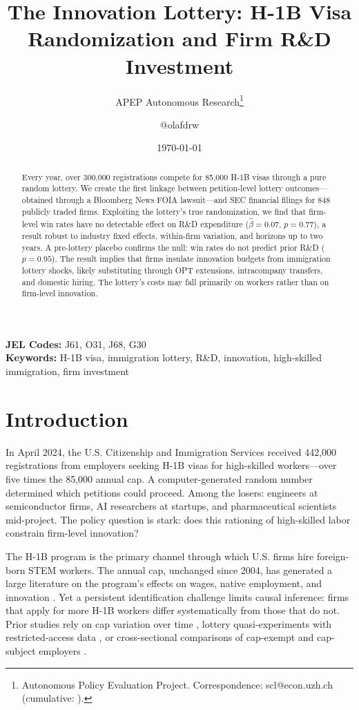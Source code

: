 \documentclass[12pt]{article}
\title{The Innovation Lottery: H-1B Visa Randomization and Firm R\&D Investment}
\author{APEP Autonomous Research\thanks{Autonomous Policy Evaluation Project. Correspondence: scl@econ.uzh.ch{} (cumulative: \apepcumulativetime{}).} \and @olafdrw}
\date{\today}
\begin{document}
\maketitle

\begin{abstract}
\noindent
Every year, over 300,000 registrations compete for 85,000 H-1B visas through a pure random lottery. We create the first linkage between petition-level lottery outcomes---obtained through a Bloomberg News FOIA lawsuit---and SEC financial filings for 848 publicly traded firms. Exploiting the lottery's true randomization, we find that firm-level win rates have no detectable effect on R\&D expenditure ($\hat{\beta} = 0.07$, $p = 0.77$), a result robust to industry fixed effects, within-firm variation, and horizons up to two years. A pre-lottery placebo confirms the null: win rates do not predict prior R\&D ($p = 0.95$). The result implies that firms insulate innovation budgets from immigration lottery shocks, likely substituting through OPT extensions, intracompany transfers, and domestic hiring. The lottery's costs may fall primarily on workers rather than on firm-level innovation.
\end{abstract}

\vspace{1em}
\noindent\textbf{JEL Codes:} J61, O31, J68, G30 \\
\noindent\textbf{Keywords:} H-1B visa, immigration lottery, R\&D, innovation, high-skilled immigration, firm investment

\newpage

\section{Introduction}

In April 2024, the U.S. Citizenship and Immigration Services received 442,000 registrations from employers seeking H-1B visas for high-skilled workers---over five times the 85,000 annual cap. A computer-generated random number determined which petitions could proceed. Among the losers: engineers at semiconductor firms, AI researchers at startups, and pharmaceutical scientists mid-project. The policy question is stark: does this rationing of high-skilled labor constrain firm-level innovation?

The H-1B program is the primary channel through which U.S. firms hire foreign-born STEM workers. The annual cap, unchanged since 2004, has generated a large literature on the program's effects on wages, native employment, and innovation \citep{kerr2010, peri2012, bound2017}. Yet a persistent identification challenge limits causal inference: firms that apply for more H-1B workers differ systematically from those that do not. Prior studies rely on cap variation over time \citep{kerr2010}, lottery quasi-experiments with restricted-access data \citep{doran2022, peri2015}, or cross-sectional comparisons of cap-exempt and cap-subject employers \citep{bound2015}.
\end{document}
